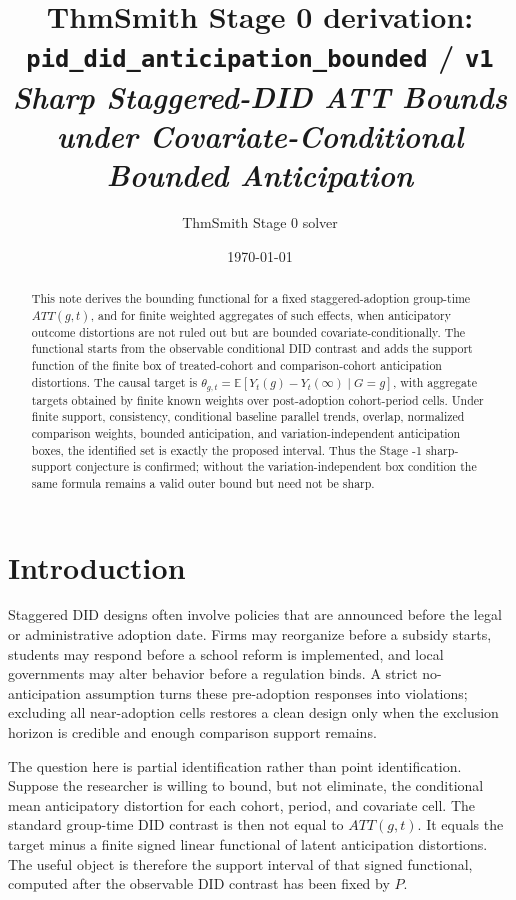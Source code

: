 \documentclass[11pt]{article}
\title{ThmSmith Stage 0 derivation: \texttt{pid\_did\_anticipation\_bounded} / \texttt{v1}%
  \\ \large\textit{Sharp Staggered-DID ATT Bounds under Covariate-Conditional Bounded Anticipation}}
\author{ThmSmith Stage 0 solver}
\date{\today}
\newcommand{\E}{\mathbb{E}}
\theoremstyle{definition}
\theoremstyle{plain}
\theoremstyle{remark}
\begin{document}
\maketitle


\begin{abstract}
This note derives the bounding functional for a fixed staggered-adoption group-time
\(ATT(g,t)\), and for finite weighted aggregates of such effects, when
anticipatory outcome distortions are not ruled out but are bounded
covariate-conditionally.  The functional starts from the observable conditional
DID contrast and adds the support function of the finite box of treated-cohort and
comparison-cohort anticipation distortions.  The causal target is
\(\theta_{g,t}=\E[Y_t(g)-Y_t(\infty)\mid G=g]\), with aggregate targets obtained by
finite known weights over post-adoption cohort-period cells.  Under finite
support, consistency, conditional baseline parallel trends, overlap, normalized
comparison weights, bounded anticipation, and variation-independent anticipation
boxes, the identified set is exactly the proposed interval.  Thus the Stage -1
sharp-support conjecture is confirmed; without the variation-independent box
condition the same formula remains a valid outer bound but need not be sharp.
\end{abstract}

\section{Introduction}
Staggered DID designs often involve policies that are announced before the legal
or administrative adoption date.  Firms may reorganize before a subsidy starts,
students may respond before a school reform is implemented, and local governments
may alter behavior before a regulation binds.  A strict no-anticipation
assumption turns these pre-adoption responses into violations; excluding all
near-adoption cells restores a clean design only when the exclusion horizon is
credible and enough comparison support remains.

The question here is partial identification rather than point identification.
Suppose the researcher is willing to bound, but not eliminate, the conditional
mean anticipatory distortion for each cohort, period, and covariate cell.  The
standard group-time DID contrast is then not equal to \(ATT(g,t)\).  It equals the
target minus a finite signed linear functional of latent anticipation
distortions.  The useful object is therefore the support interval of that signed
functional, computed after the observable DID contrast has been fixed by \(P\).
\end{document}
